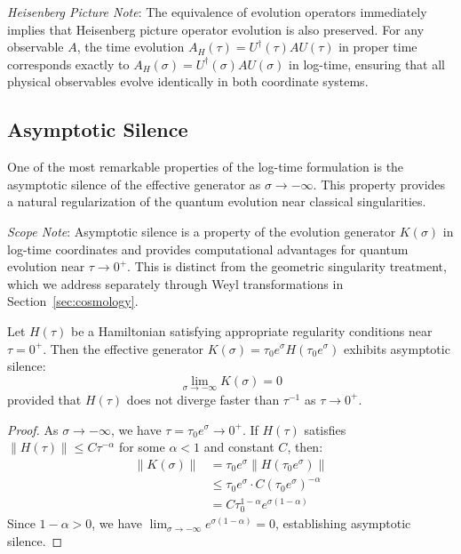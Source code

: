 \emph{Heisenberg Picture Note}: The equivalence of evolution operators immediately implies that Heisenberg picture operator evolution is also preserved. For any observable $A$, the time evolution $A_H(\tau) = U^\dagger(\tau) A U(\tau)$ in proper time corresponds exactly to $A_H(\sigma) = U^\dagger(\sigma) A U(\sigma)$ in log-time, ensuring that all physical observables evolve identically in both coordinate systems.

\subsection{Asymptotic Silence}
\label{subsec:asymptotic_silence}

One of the most remarkable properties of the log-time formulation is the asymptotic silence of the effective generator as $\sigma \to -\infty$. This property provides a natural regularization of the quantum evolution near classical singularities.

\emph{Scope Note}: Asymptotic silence is a property of the evolution generator $K(\sigma)$ in log-time coordinates and provides computational advantages for quantum evolution near $\tau \to 0^+$. This is distinct from the geometric singularity treatment, which we address separately through Weyl transformations in Section~\ref{sec:cosmology}.

\begin{theorem}
\label{thm:asymptotic_silence}
Let $H(\tau)$ be a Hamiltonian satisfying appropriate regularity conditions near $\tau = 0^+$. Then the effective generator $K(\sigma) = \tau_0 e^\sigma H(\tau_0 e^\sigma)$ exhibits asymptotic silence:
\begin{equation}
\lim_{\sigma \to -\infty} K(\sigma) = 0
\end{equation}
provided that $H(\tau)$ does not diverge faster than $\tau^{-1}$ as $\tau \to 0^+$.
\end{theorem}

\begin{proof}
As $\sigma \to -\infty$, we have $\tau = \tau_0 e^\sigma \to 0^+$. If $H(\tau)$ satisfies $\|H(\tau)\| \leq C \tau^{-\alpha}$ for some $\alpha < 1$ and constant $C$, then:
\begin{align}
\|K(\sigma)\| &= \tau_0 e^\sigma \|H(\tau_0 e^\sigma)\| \\
&\leq \tau_0 e^\sigma \cdot C (\tau_0 e^\sigma)^{-\alpha} \\
&= C \tau_0^{1-\alpha} e^{\sigma(1-\alpha)}
\end{align}
Since $1-\alpha > 0$, we have $\lim_{\sigma \to -\infty} e^{\sigma(1-\alpha)} = 0$, establishing asymptotic silence.
\end{proof}

